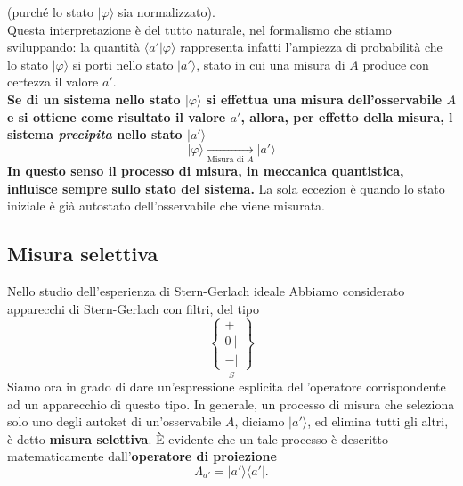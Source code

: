 (purché lo stato $\vert \varphi \rangle$ sia normalizzato).\\
Questa interpretazione è del tutto naturale, nel formalismo che stiamo sviluppando: la quantità $ \langle a' \vert \varphi \rangle$ rappresenta infatti l'ampiezza di probabilità che lo stato $\vert \varphi \rangle $ si porti nello stato $\vert a' \rangle $, stato in cui una misura di $A$ produce con certezza il valore $a'$.\\
\textbf{Se di un sistema nello stato $\vert \varphi \rangle $ si effettua una misura dell'osservabile $A$ e si ottiene come risultato il valore $a'$, allora, per effetto della misura, l sistema \textit{precipita} nello stato $ \vert a' \rangle $ }
\begin{equation}
\vert \varphi \rangle \xrightarrow[\textrm{Misura di }A]{ } \vert a' \rangle
\end{equation}
\textbf{In questo senso il processo di misura, in meccanica quantistica, influisce sempre sullo stato del sistema.} La sola eccezion è quando lo stato iniziale è già autostato dell'osservabile che viene misurata.
\subsection{Misura selettiva}
Nello studio dell'esperienza di Stern-Gerlach ideale Abbiamo considerato apparecchi di Stern-Gerlach con filtri, del tipo
\begin{equation}
\underset{S}{
\begin{Bmatrix}
+\ \\ 0\ | \\ -  |  
\end{Bmatrix}}
\end{equation}
Siamo ora in grado di dare un'espressione esplicita dell'operatore corrispondente ad un apparecchio di questo tipo. In generale, un processo di misura che seleziona solo uno degli autoket di un'osservabile $A$, diciamo $\vert a' \rangle $, ed elimina tutti gli altri, è detto \textbf{misura selettiva}. È evidente che un tale processo è descritto matematicamente dall'\textbf{operatore di proiezione}
\begin{equation}
\Lambda _{a'} = \vert a' \rangle \langle a'\vert.
\end{equation}
